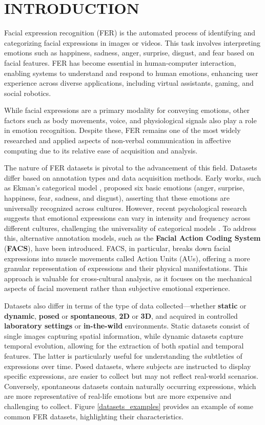 \section{INTRODUCTION}
Facial expression recognition (FER) is the automated process of identifying and categorizing facial expressions in images or videos. This task involves interpreting emotions such as happiness, sadness, anger, surprise, disgust, and fear based on facial features. FER has become essential in human-computer interaction, enabling systems to understand and respond to human emotions, enhancing user experience across diverse applications, including virtual assistants, gaming, and social robotics.

While facial expressions are a primary modality for conveying emotions, other factors such as body movements, voice, and physiological signals also play a role in emotion recognition. Despite these, FER remains one of the most widely researched and applied aspects of non-verbal communication in affective computing due to its relative ease of acquisition and analysis.

The nature of FER datasets is pivotal to the advancement of this field. Datasets differ based on annotation types and data acquisition methods. Early works, such as Ekman’s categorical model \cite{Ekman}, proposed six basic emotions (anger, surprise, happiness, fear, sadness, and disgust), asserting that these emotions are universally recognized across cultures. However, recent psychological research suggests that emotional expressions can vary in intensity and frequency across different cultures, challenging the universality of categorical models \cite{not_culturally_universal}. To address this, alternative annotation models, such as the \textbf{Facial Action Coding System} (\textbf{FACS}), have been introduced. FACS, in particular, breaks down facial expressions into muscle movements called Action Units (AUs), offering a more granular representation of expressions and their physical manifestations. This approach is valuable for cross-cultural analysis, as it focuses on the mechanical aspects of facial movement rather than subjective emotional experience\cite{FACS0}.

Datasets also differ in terms of the type of data collected—whether \textbf{static} or \textbf{dynamic}, \textbf{posed} or \textbf{spontaneous}, \textbf{2D} or \textbf{3D}, and acquired in controlled \textbf{laboratory settings} or \textbf{in-the-wild }environments. Static datasets consist of single images capturing spatial information, while dynamic datasets capture temporal evolution, allowing for the extraction of both spatial and temporal features. The latter is particularly useful for understanding the subtleties of expressions over time. Posed datasets, where subjects are instructed to display specific expressions, are easier to collect but may not reflect real-world scenarios. Conversely, spontaneous datasets contain naturally occurring expressions, which are more representative of real-life emotions but are more expensive and challenging to collect. Figure \ref{datasets_examples} provides an example of some common FER datasets, highlighting their characteristics.


